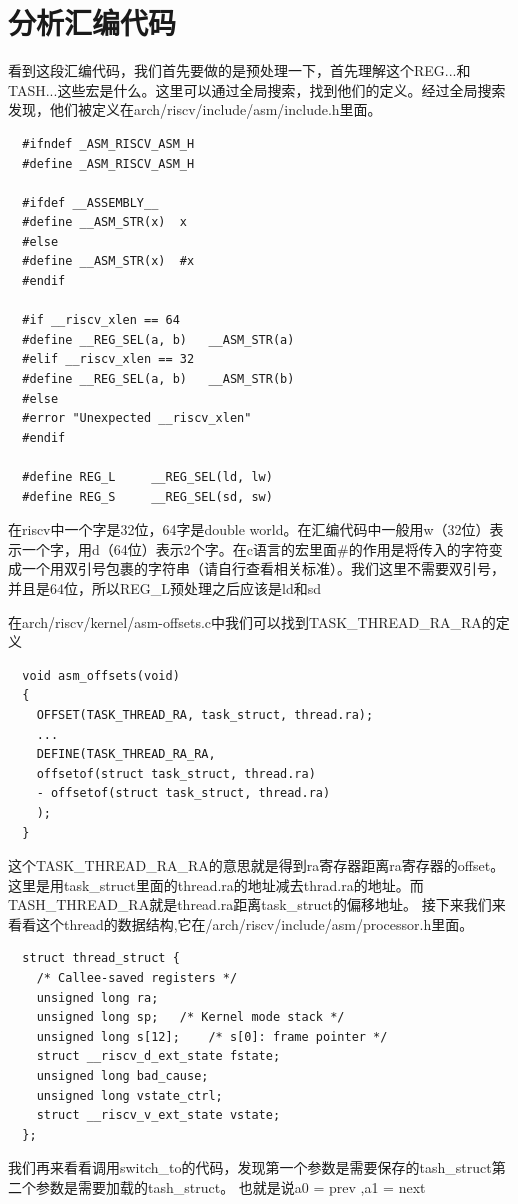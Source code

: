 \documentclass[lang=cn,10pt]{elegantbook}
\begin{document}
\section{分析汇编代码}
看到这段汇编代码，我们首先要做的是预处理一下，首先理解这个REG...和TASH...这些宏是什么。这里可以通过全局搜索，找到他们的定义。经过全局搜索发现，他们被定义在arch/riscv/include/asm/include.h里面。

\begin{lstlisting}
  #ifndef _ASM_RISCV_ASM_H
  #define _ASM_RISCV_ASM_H

  #ifdef __ASSEMBLY__
  #define __ASM_STR(x)	x
  #else
  #define __ASM_STR(x)	#x
  #endif

  #if __riscv_xlen == 64
  #define __REG_SEL(a, b)	__ASM_STR(a)
  #elif __riscv_xlen == 32
  #define __REG_SEL(a, b)	__ASM_STR(b)
  #else
  #error "Unexpected __riscv_xlen"
  #endif

  #define REG_L		__REG_SEL(ld, lw)
  #define REG_S		__REG_SEL(sd, sw)
\end{lstlisting}


在riscv中一个字是32位，64字是double world。在汇编代码中一般用w（32位）表示一个字，用d（64位）表示2个字。在c语言的宏里面\#的作用是将传入的字符变成一个用双引号包裹的字符串（请自行查看相关标准）。我们这里不需要双引号，并且是64位，所以REG\_L预处理之后应该是ld和sd

在arch/riscv/kernel/asm-offsets.c中我们可以找到TASK\_THREAD\_RA\_RA的定义

\begin{lstlisting}
  void asm_offsets(void)
  {
    OFFSET(TASK_THREAD_RA, task_struct, thread.ra);
    ...
    DEFINE(TASK_THREAD_RA_RA,
    offsetof(struct task_struct, thread.ra)
    - offsetof(struct task_struct, thread.ra)
    );
  }
\end{lstlisting}
这个TASK\_THREAD\_RA\_RA的意思就是得到ra寄存器距离ra寄存器的offset。这里是用task\_struct里面的thread.ra的地址减去thrad.ra的地址。而TASH\_THREAD\_RA就是thread.ra距离task\_struct的偏移地址。
接下来我们来看看这个thread的数据结构,它在/arch/riscv/include/asm/processor.h里面。

\begin{lstlisting}
  struct thread_struct {
    /* Callee-saved registers */
    unsigned long ra;
    unsigned long sp;	/* Kernel mode stack */
    unsigned long s[12];	/* s[0]: frame pointer */
    struct __riscv_d_ext_state fstate;
    unsigned long bad_cause;
    unsigned long vstate_ctrl;
    struct __riscv_v_ext_state vstate;
  };
\end{lstlisting}
我们再来看看调用switch\_to的代码，发现第一个参数是需要保存的tash\_struct第二个参数是需要加载的tash\_struct。
也就是说a0 = prev ,a1 = next
\end{document}
